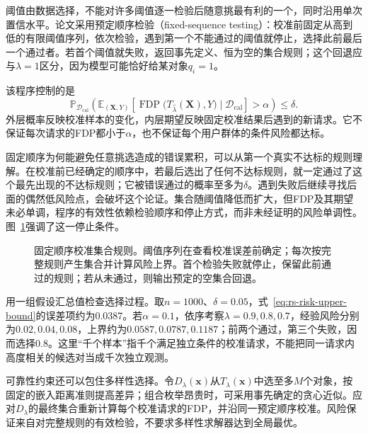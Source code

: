 阈值由数据选择，不能对许多阈值逐一检验后随意挑最有利的一个，同时沿用单次置信水平。论文采用预定顺序检验（fixed-sequence testing）：校准前固定从高到低的有限阈值序列，依次检验，遇到第一个不能通过的阈值就停止，选择此前最后一个通过者。若首个阈值就失败，返回事先定义、恒为空的集合规则；这个回退应与$\lambda=1$区分，因为模型可能恰好给某对象$q_i=1$。

该程序控制的是
\begin{equation}
 \mathbb{P}_{\mathcal{D}_{\mathrm{cal}}}
 \left(
  \mathbb{E}_{(\bm{X},Y)}
   \left[
    \operatorname{FDP}
     \bigl(T_{\widehat\lambda}(\bm{X}),Y\bigr)
    \mid\mathcal{D}_{\mathrm{cal}}
   \right]>\alpha
 \right)
 \leq\delta.
 \label{eq:rs-reliability-guarantee}
\end{equation}
外层概率反映校准样本的变化，内层期望反映固定校准结果后遇到的新请求。它不保证每次请求的FDP都小于$\alpha$，也不保证每个用户群体的条件风险都达标。

固定顺序为何能避免任意挑选造成的错误累积，可以从第一个真实不达标的规则理解。在校准前已经确定的顺序中，若最后选出了任何不达标规则，就一定通过了这个最先出现的不达标规则；它被错误通过的概率至多为$\delta$。遇到失败后继续寻找后面的偶然低风险点，会破坏这个论证。集合随阈值降低而扩大，但FDP及其期望未必单调，程序的有效性依赖检验顺序和停止方式，而非未经证明的风险单调性。图~\ref{fig:rs-risk-calibration}强调了这一停止条件。

\begin{figure}[htbp]
 \centering
 
 \caption{固定顺序校准集合规则。阈值序列在查看校准误差前确定；每次按完整规则产生集合并计算风险上界。首个检验失败就停止，保留此前通过的规则；若从未通过，则输出预定的空集合回退。}
 \label{fig:rs-risk-calibration}
\end{figure}

用一组假设汇总值检查选择过程。取$n=1000$、$\delta=0.05$，式~\eqref{eq:rs-risk-upper-bound}的误差项约为0.0387。若$\alpha=0.1$，依序考察$\lambda=0.9,0.8,0.7$，经验风险分别为$0.02,0.04,0.08$，上界约为$0.0587,0.0787,0.1187$；前两个通过，第三个失败，因而选择0.8。这里“千个样本”指千个满足独立条件的校准请求，不能把同一请求内高度相关的候选对当成千次独立观测。

可靠性约束还可以包住多样性选择。令$D_\lambda(\bm{x})$从$T_\lambda(\bm{x})$中选至多$M$个对象，按固定的嵌入距离准则提高差异；组合枚举昂贵时，可采用事先确定的贪心近似。应对$D_\lambda$的最终集合重新计算每个校准请求的FDP，并沿同一预定顺序校准。风险保证来自对完整规则的有效检验，不要求多样性求解器达到全局最优。

